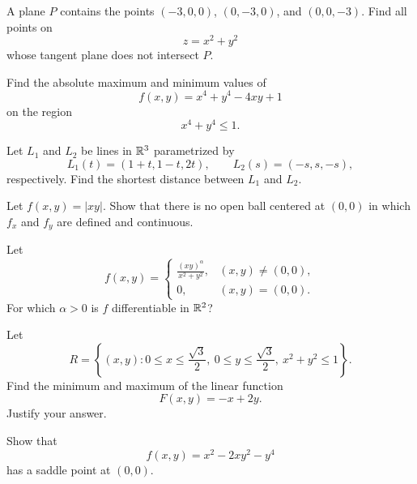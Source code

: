 \begin{problem}
A plane $P$ contains the points $(-3,0,0)$, $(0,-3,0)$, and $(0,0,-3)$. Find all points on
\[
z=x^2+y^2
\]
whose tangent plane does not intersect $P$.
\end{problem}

\begin{problem}
Find the absolute maximum and minimum values of
\[
f(x,y)=x^4+y^4-4xy+1
\]
on the region
\[
x^4+y^4\le 1.
\]
\end{problem}

\begin{problem}
Let $L_1$ and $L_2$ be lines in $\mathbb{R}^3$ parametrized by
\[
L_1(t)=(1+t,1-t,2t),
\qquad
L_2(s)=(-s,s,-s),
\]
respectively. Find the shortest distance between $L_1$ and $L_2$.
\end{problem}

\begin{problem}
Let $f(x,y)=|xy|$. Show that there is no open ball centered at $(0,0)$ in which $f_x$ and $f_y$ are defined and continuous.
\end{problem}

\begin{problem}[2021 Fall \POSTECH{} Calculus II]
Let
\[
f(x,y)=
\begin{cases}
\displaystyle\frac{(xy)^\alpha}{x^2+y^2}, & (x,y)\ne(0,0),\\[0.55em]
0, & (x,y)=(0,0).
\end{cases}
\]
For which $\alpha>0$ is $f$ differentiable in $\mathbb{R}^2$?
\end{problem}

\begin{problem}
Let
\[
R=\left\{(x,y):0\le x\le\frac{\sqrt3}{2},\ 0\le y\le\frac{\sqrt3}{2},\ x^2+y^2\le1\right\}.
\]
Find the minimum and maximum of the linear function
\[
F(x,y)=-x+2y.
\]
Justify your answer.
\end{problem}

\begin{problem}
Show that
\[
f(x,y)=x^2-2xy^2-y^4
\]
has a saddle point at $(0,0)$.
\end{problem}



